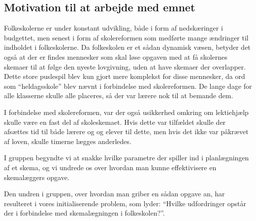 \subsection{Motivation til at arbejde med emnet}
Folkeskolerne er under konstant udvikling, både i form af nedskæringer i budgettet, men senest i form af skolereformen som medførte mange ændringer til indholdet i folkeskolerne. Da folkeskolen er et sådan dynamisk væsen, betyder det også at der er findes mennesker som skal løse opgaven med at få skolernes skemaer til at følge den nyeste lovgivning, uden at have skemaer der overlapper. Dette store puslespil blev kun gjort mere komplekst for disse mennesker, da ord som ``heldagsskole'' blev nævnt i forbindelse med skolereformen. De lange dage for alle klasserne skulle alle placeres, så der var lærere nok til at bemande dem. 

I forbindelse med skolereformen, var der også usikkerhed omkring om lektiehjælp skulle være en fast del af skoleskemaet. Hvis dette var tilfældet skulle der afsættes tid til både lærere og og elever til dette, men hvis det ikke var påkrævet af loven, skulle timerne lægges anderledes. 

I gruppen begyndte vi at snakke hvilke parametre der spiller ind i planlægningen af et skema, og vi undrede os over hvordan man kunne effektivisere en skemalæggers opgave.

Den undren i gruppen, over hvordan man griber en sådan opgave an, har resulteret i vores initialiserende problem, som lyder: ``Hvilke udfordringer opstår der i forbindelse med skemalægningen i folkeskolen?''.